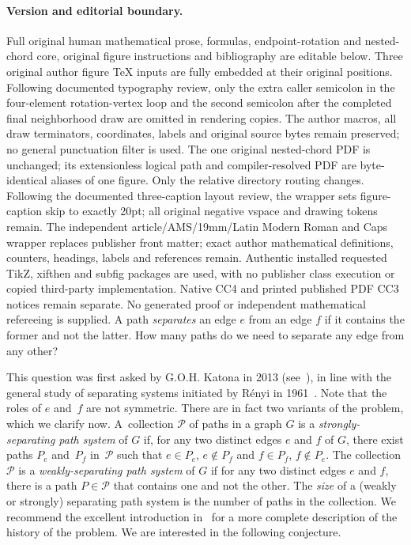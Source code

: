 \documentclass[11pt]{article}
\newcommand{\defi}[1]{\emph{#1}}
\begin{document}
\paragraph{Version and editorial boundary.} Full original human mathematical prose, formulas, endpoint-rotation and nested-chord core, original figure instructions and bibliography are editable below. Three original author figure TeX inputs are fully embedded at their original positions. Following documented typography review, only the extra caller semicolon in the four-element rotation-vertex loop and the second semicolon after the completed final neighborhood draw are omitted in rendering copies. The author macros, all draw terminators, coordinates, labels and original source bytes remain preserved; no general punctuation filter is used. The one original nested-chord PDF is unchanged; its extensionless logical path and compiler-resolved PDF are byte-identical aliases of one figure. Only the relative directory routing changes. Following the documented three-caption layout review, the wrapper sets figure-caption skip to exactly 20pt; all original negative vspace and drawing tokens remain. The independent article/AMS/19mm/Latin Modern Roman and Caps wrapper replaces publisher front matter; exact author mathematical definitions, counters, headings, labels and references remain. Authentic installed requested TikZ, xifthen and subfig packages are used, with no publisher class execution or copied third-party implementation. Native CC4 and printed published PDF CC3 notices remain separate. No generated proof or independent mathematical refereeing is supplied.
\clearpage
A path \defi{separates} an edge $e$ from an edge $f$ if it contains the former and not the latter. How many paths do we need to separate any edge from any other?

This question was first asked by G.O.H. Katona in 2013 (see~\cite{falgas2013separating}), in line with the general study of separating systems initiated by R\'enyi in 1961~\cite{renyi1961random}. Note that the roles of $e$ and~$f$ are not symmetric. There are in fact two variants of the problem, which we clarify now. A~collection $\mathcal{P}$ of paths in a graph $G$ is a \defi{strongly-separating path system} of $G$ if, for any two distinct edges $e$ and $f$ of $G$, there exist paths $P_e$ and~$P_f$ in~$\mathcal{P}$ such that $e \in P_e$, $e \not\in P_f$ and $f\in P_f$, $f \not\in P_e$.
The collection $\mathcal{P}$ is a \defi{weakly-separating path system} of $G$ if for any two distinct edges $e$ and $f$, there is a path $P \in \mathcal{P}$ that contains one and not the other.
The \defi{size} of a (weakly or strongly) separating path system is the number of paths in the collection.
We recommend the excellent introduction in~\cite{letzter2022separating} for a more complete description of the history of the problem.
We are interested in the following conjecture.
\end{document}

